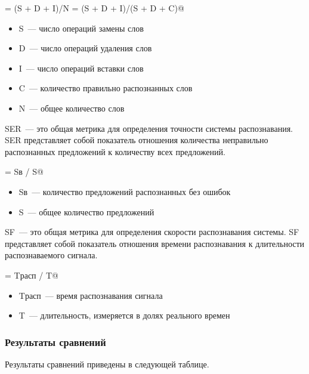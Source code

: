 \documentclass[10pt, a5paper]{article}
\begin{document}
\verb@WER = (S + D + I)/N = (S + D + I)/(S + D + C)@

\begin{itemize}
  \item S~--- число операций замены слов
  \item D~--- число операций удаления слов
  \item I~--- число операций вставки слов
  \item C~--- количество правильно распознанных слов
  \item N~--- общее количество слов
\end{itemize}

SER~--- это общая метрика для определения точности системы распознавания. SER представляет собой показатель отношения количества неправильно распознанных предложений к количеству всех предложений.

\verb@SER = Sв / S@

\begin{itemize}
  \item Sв~--- количество предложений распознанных без ошибок
  \item S~--- общее количество предложений
\end{itemize}

SF~--- это общая метрика для определения скорости распознавания системы. SF представляет собой показатель отношения времени распознавания к длительности распознаваемого сигнала.

\verb@SF = Tрасп / T@

\begin{itemize}
  \item Tрасп~--- время распознавания сигнала
  \item T~--- длительность, измеряется в долях реального времен
\end{itemize}

\subsubsection*{Результаты сравнений}

Результаты сравнений приведены в следующей таблице.
\end{document}
